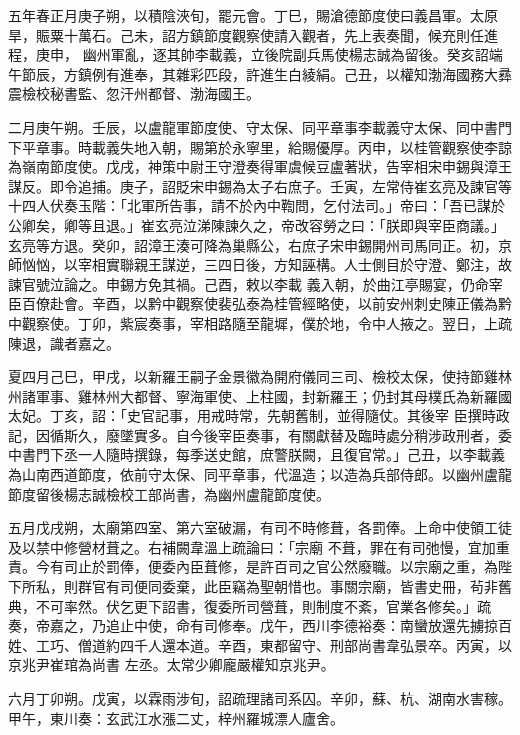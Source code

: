 \begin{pinyinscope}
 五年春正月庚子朔，以積陰浹旬，罷元會。丁巳，賜滄德節度使曰義昌軍。太原旱，賑粟十萬石。己未，詔方鎮節度觀察使請入觀者，先上表奏聞，候充則任進程，庚申，
 幽州軍亂，逐其帥李載義，立後院副兵馬使楊志誠為留後。癸亥詔端午節辰，方鎮例有進奉，其雜彩匹段，許進生白綾絹。己丑，以權知渤海國務大彞震檢校秘書監、忽汗州都督、渤海國王。



 二月庚午朔。壬辰，以盧龍軍節度使、守太保、同平章事李載義守太保、同中書門下平章事。時載義失地入朝，賜第於永寧里，給賜優厚。丙申，以桂管觀察使李諒為嶺南節度使。戊戌，神策中尉王守澄奏得軍虞候豆盧著狀，告宰相宋申錫與漳王
 謀反。即令追捕。庚子，詔貶宋申錫為太子右庶子。壬寅，左常侍崔玄亮及諫官等十四人伏奏玉階：「北軍所告事，請不於內中鞫問，乞付法司。」帝曰：「吾已謀於公卿矣，卿等且退。」崔玄亮泣涕陳諫久之，帝改容勞之曰：「朕即與宰臣商議。」玄亮等方退。癸卯，詔漳王湊可降為巢縣公，右庶子宋申錫開州司馬同正。初，京師忷忷，以宰相實聯親王謀逆，三四日後，方知誣構。人士側目於守澄、鄭注，故諫官號泣論之。申錫方免其禍。己酉，敕以李載
 義入朝，於曲江亭賜宴，仍命宰臣百僚赴會。辛酉，以黔中觀察使裴弘泰為桂管經略使，以前安州刺史陳正儀為黔中觀察使。丁卯，紫宸奏事，宰相路隨至龍墀，僕於地，令中人掖之。翌日，上疏陳退，識者嘉之。



 夏四月己巳，甲戌，以新羅王嗣子金景徽為開府儀同三司、檢校太保，使持節雞林州諸軍事、雞林州大都督、寧海軍使、上柱國，封新羅王；仍封其母樸氏為新羅國太妃。丁亥，詔：「史官記事，用戒時常，先朝舊制，並得隨仗。其後宰
 臣撰時政記，因循斯久，廢墜實多。自今後宰臣奏事，有關獻替及臨時處分稍涉政刑者，委中書門下丞一人隨時撰錄，每季送史館，庶警朕闕，且復官常。」己丑，以李載義為山南西道節度，依前守太保、同平章事，代溫造；以造為兵部侍郎。以幽州盧龍節度留後楊志誠檢校工部尚書，為幽州盧龍節度使。



 五月戊戌朔，太廟第四室、第六室破漏，有司不時修葺，各罰俸。上命中使領工徒及以禁中修營材葺之。右補闕韋溫上疏論曰：「宗廟
 不葺，罪在有司弛慢，宜加重責。今有司止於罰俸，便委內臣葺修，是許百司之官公然廢職。以宗廟之重，為陛下所私，則群官有司便同委棄，此臣竊為聖朝惜也。事關宗廟，皆書史冊，茍非舊典，不可率然。伏乞更下詔書，復委所司營葺，則制度不紊，官業各修矣。」疏奏，帝嘉之，乃追止中使，命有司修奉。戊午，西川李德裕奏：南蠻放還先擄掠百姓、工巧、僧道約四千人還本道。辛酉，東都留守、刑部尚書韋弘景卒。丙寅，以京兆尹崔琯為尚書
 左丞。太常少卿龐嚴權知京兆尹。



 六月丁卯朔。戊寅，以霖雨涉旬，詔疏理諸司系囚。辛卯，蘇、杭、湖南水害稼。甲午，東川奏：玄武江水漲二丈，梓州羅城漂人廬舍。




\end{pinyinscope}
